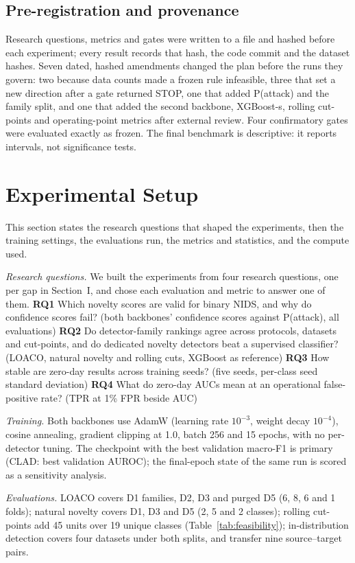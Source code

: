 \documentclass[conference]{IEEEtran}
\begin{document}
\subsection{Pre-registration and provenance}\label{sec:prereg}
Research questions, metrics and gates were written to a file and hashed before each experiment; every result records that hash, the code commit and the dataset hashes. Seven dated, hashed amendments changed the plan before the runs they govern: two because data counts made a frozen rule infeasible, three that set a new direction after a gate returned STOP, one that added P(attack) and the family split, and one that added the second backbone, XGBoost-s, rolling cut-points and operating-point metrics after external review. Four confirmatory gates were evaluated exactly as frozen. The final benchmark is descriptive: it reports intervals, not significance tests.

\section{Experimental Setup}\label{sec:setup}
This section states the research questions that shaped the experiments, then the training settings, the evaluations run, the metrics and statistics, and the compute used.

\emph{Research questions.} We built the experiments from four research questions, one per gap in Section~I, and chose each evaluation and metric to answer one of them. \textbf{RQ1} Which novelty scores are valid for binary NIDS, and why do confidence scores fail? (both backbones' confidence scores against P(attack), all evaluations) \textbf{RQ2} Do detector-family rankings agree across protocols, datasets and cut-points, and do dedicated novelty detectors beat a supervised classifier? (LOACO, natural novelty and rolling cuts, XGBoost as reference) \textbf{RQ3} How stable are zero-day results across training seeds? (five seeds, per-class seed standard deviation) \textbf{RQ4} What do zero-day AUCs mean at an operational false-positive rate? (TPR at 1\% FPR beside AUC)

\emph{Training.} Both backbones use AdamW (learning rate $10^{-3}$, weight decay $10^{-4}$), cosine annealing, gradient clipping at 1.0, batch 256 and 15 epochs, with no per-detector tuning. The checkpoint with the best validation macro-F1 is primary (CLAD: best validation AUROC); the final-epoch state of the same run is scored as a sensitivity analysis.

\emph{Evaluations.} LOACO covers D1 families, D2, D3 and purged D5 (6, 8, 6 and 1 folds); natural novelty covers D1, D3 and D5 (2, 5 and 2 classes); rolling cut-points add 45 units over 19 unique classes (Table~\ref{tab:feasibility}); in-distribution detection covers four datasets under both splits, and transfer nine source--target pairs.
\end{document}

